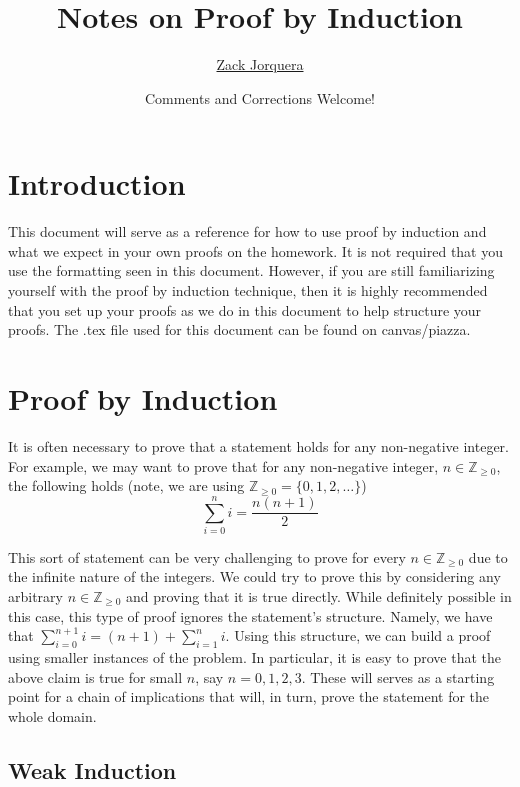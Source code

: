 \documentclass{article}
\title{Notes on Proof by Induction}
\author{\href{https://zackjorquera.github.io/}{Zack Jorquera}}
\date{\small{Comments and Corrections Welcome!}}
\theoremstyle{plain}
\theoremstyle{definition}
\newcommand{\ZZ}{\mathbb{Z}_{\geq 0}}
\begin{document}
\maketitle

\begingroup
\hypersetup{linktocpage}
\tableofcontents
\endgroup

\setlength{\parindent}{0cm}
\setlength{\parskip}{0.35em plus 0.035em minus 0.07em}

\section{Introduction}

This document will serve as a reference for how to use proof by induction and what we expect in your own proofs on the homework. It is not required that you use the formatting seen in this document. However, if you are still familiarizing yourself with the proof by induction technique, then it is highly recommended that you set up your proofs as we do in this document to help structure your proofs. The .tex file used for this document can be found on canvas/piazza.

\section{Proof by Induction}

It is often necessary to prove that a statement holds for any non-negative integer. For example, we may want to prove that for any non-negative integer, \(n \in \ZZ\), the following holds (note, we are using \(\ZZ = \{0, 1, 2, \dotsc\}\))
\[\sum_{i=0}^n i = \frac{n(n+1)}{2}\]

This sort of statement can be very challenging to prove for every \(n \in \ZZ\) due to the infinite nature of the integers. We could try to prove this by considering any arbitrary \(n \in \ZZ\) and proving that it is true directly. While definitely possible in this case, this type of proof ignores the statement's structure. Namely, we have that \(\sum_{i=0}^{n+1} i = (n+1) + \sum_{i=1}^n i\). Using this structure, we can build a proof using smaller instances of the problem. In particular, it is easy to prove that the above claim is true for small \(n\), say \(n=0,1,2,3\). These will serves as a starting point for a chain of implications that will, in turn, prove the statement for the whole domain.

\subsection{Weak Induction}
\end{document}
